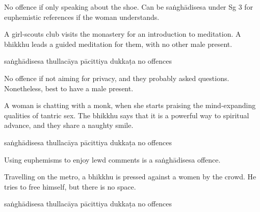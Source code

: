 \begin{exam}{\autoExamName}
\begin{problem*}
\begin{parts}
  \bigskip

  \begin{solution}
    No offence if only speaking about the shoe.
    Can be saṅghādisesa under Sg 3 for euphemistic references if the woman understands.
  \end{solution}

  \item A girl-scouts club visits the monastery for an introduction to
    meditation. A bhikkhu leads a guided meditation for them, with no other male
    present.

    \bigskip

    \begin{answers}{5}
      \bChoices
       saṅghādisesa\eAns
       thullacāya\eAns
       pācittiya\eAns
       dukkaṭa\eAns
       no offences\eAns
      \eChoices
    \end{answers}

    \begin{solution}
      No offence if not aiming for privacy, and they probably asked questions.
      Nonetheless, best to have a male present.
    \end{solution}

    \bigskip

  \item A woman is chatting with a monk, when she starts praising the
    mind-expanding qualities of tantric sex. The bhikkhu says that it is a
    powerful way to spiritual advance, and they share a naughty smile.

    \bigskip

    \begin{answers}{5}
      \bChoices
       saṅghādisesa\eAns
       thullacāya\eAns
       pācittiya\eAns
       dukkaṭa\eAns
       no offences\eAns
      \eChoices
    \end{answers}

    \begin{solution}
      Using euphemisms to enjoy lewd comments is a saṅghādisesa offence.
    \end{solution}

    \bigskip

  \item Travelling on the metro, a bhikkhu is pressed against a women by the
    crowd. He tries to free himself, but there is no space.

    \bigskip

    \begin{answers}{5}
      \bChoices
       saṅghādisesa\eAns
       thullacāya\eAns
       pācittiya\eAns
       dukkaṭa\eAns
       no offences\eAns
      \eChoices
    \end{answers}


\end{parts}
\end{problem*}
\end{exam}
